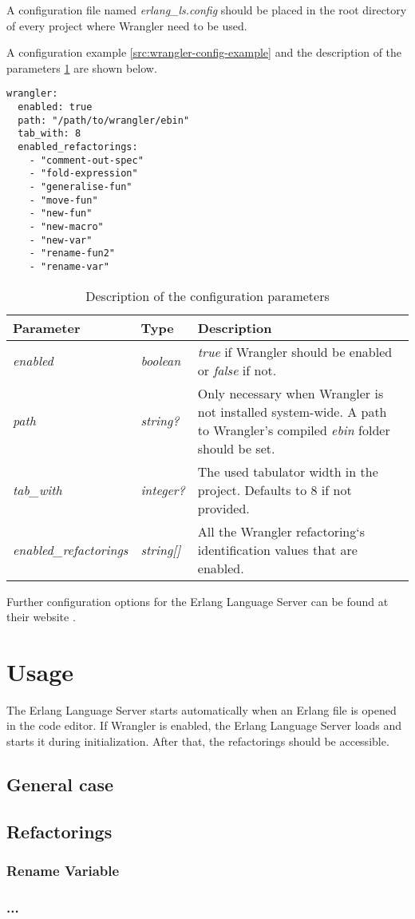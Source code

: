 A configuration file named \emph{erlang\_ls.config} should be placed in the root directory of every project where Wrangler need to be used.

A configuration example \ref{src:wrangler-config-example} and the description of the parameters \ref{tab:wrangler-config-descr} are shown below.

\begin{lstlisting}
wrangler:
  enabled: true
  path: "/path/to/wrangler/ebin" 
  tab_with: 8
  enabled_refactorings:
    - "comment-out-spec"
    - "fold-expression"
    - "generalise-fun"
    - "move-fun"
    - "new-fun"
    - "new-macro"
    - "new-var"
    - "rename-fun2"
    - "rename-var"
\end{lstlisting}


\begin{table}[H]
	\centering
	\begin{tabular}{ | m{} | m{} | m{} | }
		\hline
		\textbf{Parameter} & \textbf{Type} & \textbf{Description} \\
		\hline \hline
		\emph{enabled} & \emph{boolean} & \emph{true} if Wrangler should be enabled or \emph{false} if not. \\
		\hline
		\emph{path} & \emph{string?} & Only necessary when Wrangler is not installed system-wide. A path to Wrangler's compiled \emph{ebin} folder should be set. \\
		\hline
		\emph{tab\_with} & \emph{integer?} & The used tabulator width in the project. Defaults to 8 if not provided. \\
		\hline
		\emph{enabled\_refactorings} & \emph{string[]} & All the Wrangler refactoring`s identification values that are enabled.\\
		\hline
	\end{tabular}
	\caption{Description of the configuration parameters}
	\label{tab:wrangler-config-descr}
\end{table}

Further configuration options for the Erlang Language Server can be found at their website \cite{ELSConfig}.

\section{Usage}

The Erlang Language Server starts automatically when an Erlang file is opened in the code editor. If Wrangler is enabled, the Erlang Language Server loads and starts it during initialization. After that, the refactorings should be accessible.

\subsection{General case}
\subsection{Refactorings}

\subsubsection{Rename Variable}
\subsubsection{...}


